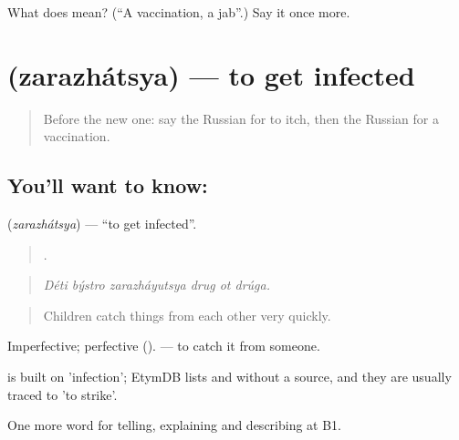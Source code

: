\begin{tcolorbox}[breakable,colback=teal!4,colframe=teal!35!black,title={Before you move on}]
What does  mean? (\textquotedblleft{}A vaccination, a jab\textquotedblright{}.) Say it once more.
\end{tcolorbox}
\section[\texorpdfstring{\ru{заражаться} (zarazhátsya)}{заражаться (zarazhátsya)}]{ (zarazhátsya) — to get infected}

\label{lesson:RU-C487-zarazhatsya}



\begin{quote}
Before the new one: say the Russian for to itch, then the Russian for a vaccination.
\end{quote}

\subsection*{You'll want to know: }
\textbf{} (\emph{zarazhátsya}) — \textquotedblleft{}to get infected\textquotedblright{}.

\begin{quote}
     .
\end{quote}

\begin{quote}
\emph{Déti býstro zarazháyutsya drug ot drúga.}
\end{quote}

\begin{quote}
Children catch things from each other very quickly.
\end{quote}

Imperfective; perfective  (). \emph{  } — to catch it from someone.

\begin{cousinweb}
\emph{} is built on \emph{} 'infection'; EtymDB lists \emph{} and \emph{} without a source, and they are usually traced to \emph{} 'to strike'.
\end{cousinweb}

\begin{grammarlens}[title={What you've built}]
One more word for telling, explaining and describing at B1.
\end{grammarlens}


